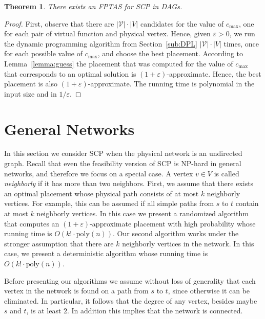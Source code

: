 \documentclass[11pt]{article}
\newtheorem{theorem}{Theorem}
\newcommand{\abs}[1]{\left| #1 \right|}
\newcommand{\eps}{\varepsilon}
\newcommand{\scp}{\textsc{SCP}\xspace}
\newcommand{\calV}{\mathcal{V}}
\begin{document}
\begin{theorem}
\label{thm:fptas}
There exists an FPTAS for \scp in DAGs.
\end{theorem}
\begin{proof}
First, observe that there are $\abs{\calV} \cdot \abs{V}$ candidates
for the value of $c_{\max}$, one for each pair of virtual function and
physical vertex.  
%
Hence, given $\eps>0$, we run the dynamic programming algorithm from
Section~\ref{sub:DPL} $\abs{\calV} \cdot \abs{V}$ times, once for each
possible value of $c_{\max}$, and choose the best placement.
%
According to Lemma~\ref{lemma:guess} the placement that was computed
for the value of $c_{\max}$ that corresponds to an optimal solution is
$(1+\eps)$-approximate.  Hence, the best placement is also
$(1+\eps)$-approximate.
%
The running time is polynomial in the input size and in $1/\eps$.
\end{proof}



\section{General Networks}
\label{sec:general}

In this section we consider \scp when the physical network is an
undirected graph.  Recall that even the feasibility version of \scp is
NP-hard in general networks, and therefore we focus on a special case.
%
A vertex $v \in V$ is called \emph{neighborly} if it has more than two
neighbors.
%
First, we assume that there exists an optimal placement whose physical
path consists of at most $k$ neighborly vertices.  For example, this
can be assumed if all simple paths from $s$ to $t$ contain at most $k$
neighborly vertices.  In this case we present a randomized algorithm
that computes an $(1+\eps)$-approximate placement with high
probability whose running time is $O(k! \cdot \text{poly}(n))$.
%
Our second algorithm works under the stronger assumption that there
are $k$ neighborly vertices in the network.  In this case, we present
a deterministic algorithm whose running time is $O(k! \cdot
\text{poly}(n))$.

Before presenting our algorithms we assume without loss of generality
that each vertex in the network is found on a path from $s$ to $t$,
since otherwise it can be eliminated.  In particular, it follows that
the degree of any vertex, besides maybe $s$ and $t$, is at least $2$.
In addition this implies that the network is connected.
\end{document}
